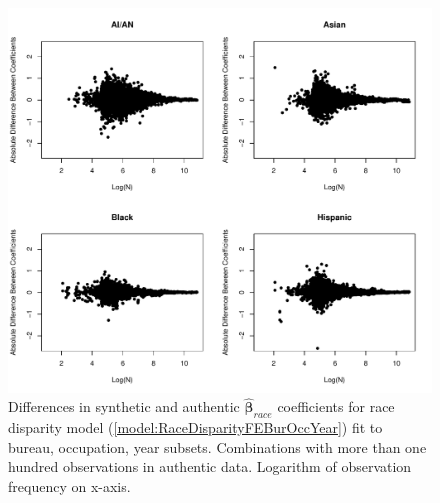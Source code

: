 \documentclass[10pt, letterpaper]{article}
\newcommand{\mest}[1]{\hat{\bm{#1}}}
\begin{document}
\begin{spacing}{1.0}
\vspace{20pt}

\begin{figure}[h!]
    \centering
    \includegraphics[width=6in]{dibbs_agencyoccyear_diff_lnn.pdf}
    \caption{Differences in synthetic and authentic $\mest{\beta}_{race}$ coefficients for race disparity model (\ref{model:RaceDisparityFEBurOccYear}) fit to bureau, occupation, year subsets.  Combinations with more than one hundred observations in authentic data.  Logarithm of observation frequency on x-axis.}
    \label{figure:dibbs_agencyoccyear_diff_lnn}
\end{figure}

\clearpage


\end{spacing}
\end{document}
